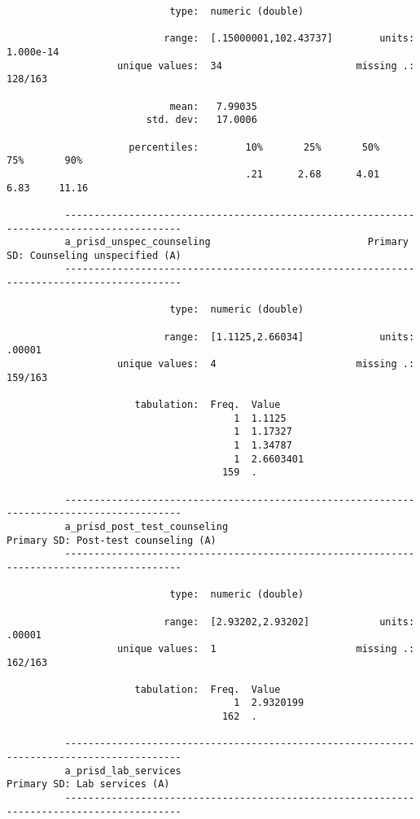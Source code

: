\documentclass{article}
\begin{document}
\begin{verbatim}
                            type:  numeric (double)
          
                           range:  [.15000001,102.43737]        units:  1.000e-14
                   unique values:  34                       missing .:  128/163
          
                            mean:   7.99035
                        std. dev:   17.0006
          
                     percentiles:        10%       25%       50%       75%       90%
                                         .21      2.68      4.01      6.83     11.16
          
          ------------------------------------------------------------------------------------------
          a_prisd_unspec_counseling                           Primary SD: Counseling unspecified (A)
          ------------------------------------------------------------------------------------------
          
                            type:  numeric (double)
          
                           range:  [1.1125,2.66034]             units:  .00001
                   unique values:  4                        missing .:  159/163
          
                      tabulation:  Freq.  Value
                                       1  1.1125
                                       1  1.17327
                                       1  1.34787
                                       1  2.6603401
                                     159  .
          
          ------------------------------------------------------------------------------------------
          a_prisd_post_test_counseling                          Primary SD: Post-test counseling (A)
          ------------------------------------------------------------------------------------------
          
                            type:  numeric (double)
          
                           range:  [2.93202,2.93202]            units:  .00001
                   unique values:  1                        missing .:  162/163
          
                      tabulation:  Freq.  Value
                                       1  2.9320199
                                     162  .
          
          ------------------------------------------------------------------------------------------
          a_prisd_lab_services                                          Primary SD: Lab services (A)
          ------------------------------------------------------------------------------------------
          

\end{verbatim}
\end{document}
